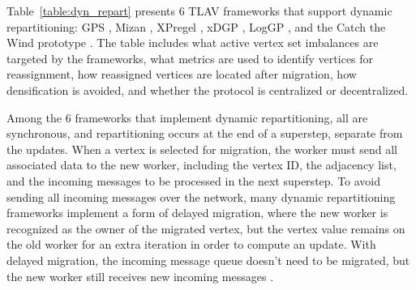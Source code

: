 \documentclass[reprint,twocolumn,showpacs,preprintnumbers,amsmath, aps,pre,amssymb]{revtex4-1}
\begin{document}
Table~\ref{table:dyn_repart} presents 6 TLAV frameworks that support dynamic repartitioning: GPS \cite{Salihoglu2013}, Mizan \cite{Khayyat2013}, XPregel \cite{Bao2013}, xDGP \cite{Vaquero2013a}, LogGP \cite{Xu2013}, and the Catch the Wind prototype \cite{Shang2013}.  The table includes what active vertex set imbalances are targeted by the frameworks, what metrics are used to identify vertices for reassignment, how reassigned vertices are located after migration, how densification is avoided, and whether the protocol is centralized or decentralized.  

Among the 6 frameworks that implement dynamic repartitioning, all are synchronous, and repartitioning occurs at the end of a superstep, separate from the updates.  When a vertex is selected for migration, the worker must send all associated data to the new worker, including the vertex ID, the adjacency list, and the incoming messages to be processed in the next superstep.  To avoid sending all incoming messages over the network, many dynamic repartitioning frameworks implement a form of delayed migration, where the new worker is recognized as the owner of the migrated vertex, but the vertex value remains on the old worker for an extra iteration in order to compute an update.  With delayed migration, the incoming message queue doesn't need to be migrated, but the new worker still receives new incoming messages \cite{Khayyat2013,Salihoglu2013}.
\end{document}
